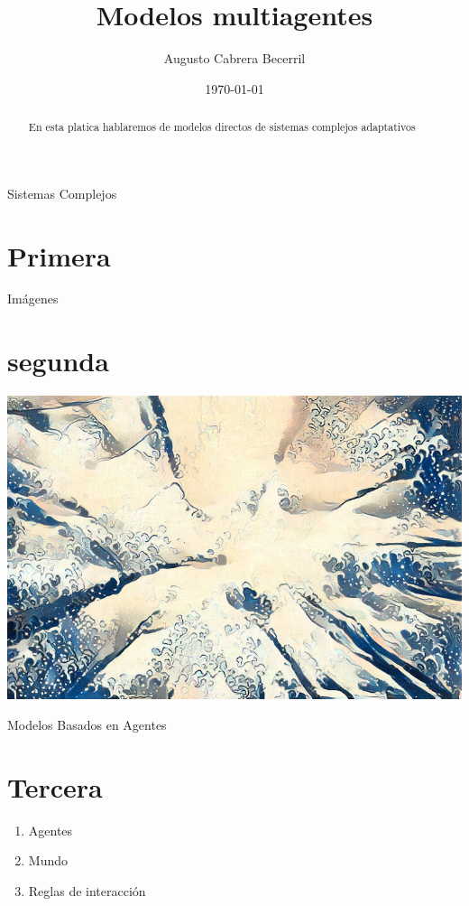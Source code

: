 \documentclass[final]{beamer}
\title{Modelos multiagentes}
\author{Augusto Cabrera Becerril}
\date{\today}
\institute{Facultad de Ciencias UNAM}
\begin{document}
\begin{frame}
\maketitle
\end{frame}

\begin{frame}{Sistemas Complejos}
\section{Primera}
    \begin{abstract}
    En esta platica  hablaremos de modelos directos de sistemas complejos adaptativos   
    \end{abstract}
    
\end{frame}

\begin{frame}{Imágenes}
\section{segunda}
\includegraphics[width=\textwidth]{imagen1.jpg}
\end{frame}

\begin{frame}{Modelos Basados en Agentes}
\section{Tercera}
\pause
    \begin{enumerate}
        \item Agentes
        \pause
        \item Mundo
        \pause
        \item Reglas de interacción
    \end{enumerate}
\end{frame}
\end{document}
